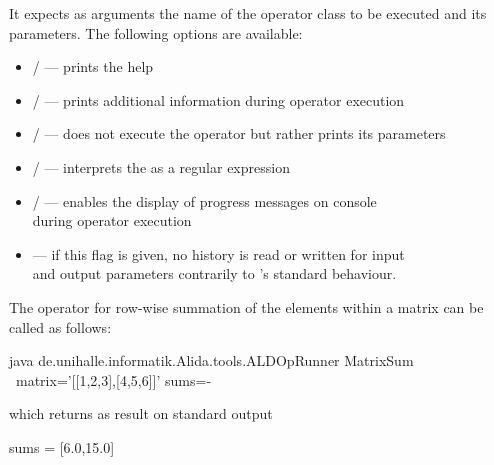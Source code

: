 \vspace*{-0.25cm}
It expects as arguments the name of the operator class to be executed and its
parameters. The following options are available:
\begin{itemize}
  \item {} /  \hspace*{0.5cm} --- \hspace*{0.5cm}
  	prints the help
  \item {} /  \hspace*{0.5cm} --- \hspace*{0.5cm}
  	prints additional information during operator execution
  \item {} /  \hspace*{0.5cm} --- \hspace*{0.5cm}
  	does not execute the operator but rather prints its parameters
  \item {} /  \hspace*{0.5cm} --- \hspace*{0.5cm}
        interprets the   as a regular expression
  \item {} /  \hspace*{0.5cm} --- \hspace*{0.5cm}
        enables the display of progress messages on console \\
        \hspace*{5.65cm}during operator execution
  \item {} \hspace*{0.5cm} --- \hspace*{0.5cm}
        if this flag is given, no history is read or written for input\\
        \hspace*{4cm}and output parameters contrarily to \alida's standard
        behaviour.
\end{itemize}
The operator  for row-wise summation of the elements within a
matrix can be called as follows:
\vspace*{0.5cm}
\begin{code}
java de.unihalle.informatik.Alida.tools.ALDOpRunner MatrixSum \
      matrix='[[1,2,3],[4,5,6]]' sums=-
\end{code}

which returns as result on standard output
\begin{code}
sums = [6.0,15.0]
\end{code}

